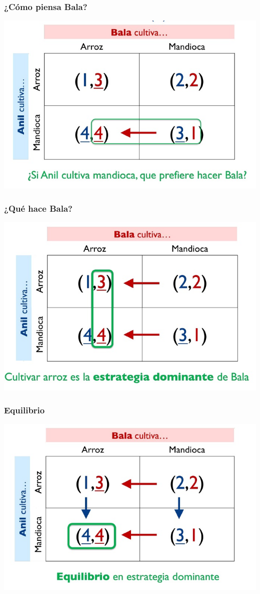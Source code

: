 \documentclass{beamer}
\begin{document}
\begin{frame}
\frametitle{ ¿Cómo piensa Bala?}
\centering
\includegraphics[scale=0.6]{Figures/Tema_03_17_bala.jpg}
\end{frame}

\begin{frame}
\frametitle{ ¿Qué hace Bala?}
\centering
\includegraphics[scale=0.6]{Figures/Tema_03_18_bala.jpg}
\end{frame}

\begin{frame}
\frametitle{Equilibrio}
\centering
\includegraphics[scale=0.6]{Figures/Tema_03_19_bala.jpg}
\end{frame}
\end{document}
